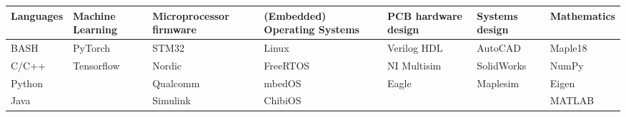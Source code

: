 
\begin{cvparagraph}

\begin{center}
  \begin{tabular}{L L L L L L L}
  Languages & Machine Learning & Microprocessor firmware & (Embedded) Operating Systems & PCB hardware design & Systems design & Mathematics \\
  \hline
  BASH      & PyTorch    & STM32    & Linux    & Verilog HDL & AutoCAD    & Maple18 \\
  C/C++     & Tensorflow & Nordic   & FreeRTOS & NI Multisim & SolidWorks & NumPy   \\
  Python    &            & Qualcomm & mbedOS   & Eagle       & Maplesim   & Eigen   \\
  Java      &            & Simulink & ChibiOS  &             &            & MATLAB  \\
  \end{tabular}
\end{center}
\end{cvparagraph}
